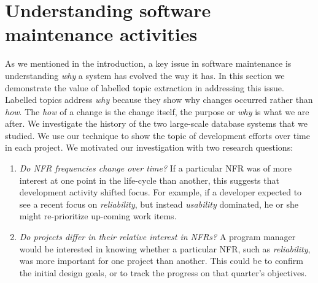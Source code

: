 \documentclass[]{sig-alternate}
\begin{document}
\section{Understanding software maintenance activities} 
\label{sec:analysis}
As we mentioned in the introduction, a key issue in software maintenance is understanding \emph{why} a system has evolved the way it has. 
In this section we demonstrate the value of labelled topic extraction
in addressing this issue. 
Labelled topics address \emph{why}  because they show why changes
occurred rather than \emph{how}. 
The \emph{how} of a change is the change itself, the purpose or
\emph{why} is what we are after.
We investigate the history of the two large-scale database systems that we studied. 
We use our technique to show the topic of development efforts over time in each project.
We motivated our investigation with two research questions:
\begin{enumerate}
\item \emph{Do NFR frequencies change over time?} If a particular NFR was of more interest at one point in the life-cycle than another, this suggests that development activity shifted focus. For example, if a developer expected to see a recent focus on \emph{reliability}, but instead \emph{usability} dominated, he or she might re-prioritize up-coming work items.
\item \emph{Do projects differ in their relative interest in NFRs?} A program manager would be interested in knowing whether a particular NFR, such as \emph{reliability}, was more important for one project than another. This could be to confirm the initial design goals, or to track the progress on that quarter's objectives.  
\end{enumerate}
\end{document}
